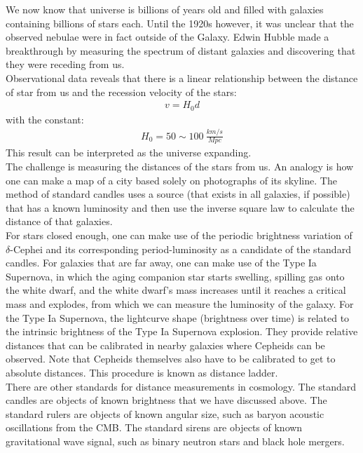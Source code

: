 \documentclass[11pt]{article}
\theoremstyle{break}
\theoremstyle{break}
\begin{document}
We now know that universe is billions of years old and filled with galaxies containing billions of stars each. Until the 1920s however, it was unclear that the observed nebulae were in fact outside of the Galaxy. Edwin Hubble made a breakthrough by measuring the spectrum of distant galaxies and discovering that they were receding from us.\\

Observational data reveals that there is a linear relationship between the distance of star from us and the recession velocity of the stars:
\begin{align*}
v = H_0 d \tag{Hubble's Law}
\end{align*}
with the constant:
\begin{align*}
H_0 = 50 \sim 100 \ \frac{km/s}{Mpc}
\end{align*}
This result can be interpreted as the universe expanding. \\

The challenge is measuring the distances of the stars from us. An analogy is how one can make a map of a city based solely on photographs of its skyline. The method of standard candles uses a source (that exists in all galaxies, if possible) that has a known luminosity and then use the inverse square law to calculate the distance of that galaxies.  \\

For stars closed enough, one can make use of the periodic brightness variation of $\delta$-Cephei and its corresponding period-luminosity as a candidate of the standard candles. For galaxies that are far away, one can make use of the Type Ia Supernova, in which the aging companion star starts swelling, spilling gas onto the white dwarf, and the white dwarf's mass increases until it reaches a critical mass and explodes, from which we can measure the luminosity of the galaxy. For the Type Ia Supernova,  the lightcurve shape (brightness over time) is related to the intrinsic brightness of the Type Ia Supernova explosion. 
They provide relative distances that  can be calibrated in nearby galaxies where Cepheids can be observed. Note that Cepheids themselves also have to be calibrated to get to absolute distances. This procedure is known as distance ladder.\\

There are other standards for distance measurements in cosmology. The standard candles are objects of known brightness that we have discussed above. The standard rulers are objects of known angular size, such as baryon acoustic oscillations from the CMB. The standard sirens are objects of known gravitational wave signal, such as binary neutron stars and black hole mergers.\\
\end{document}
